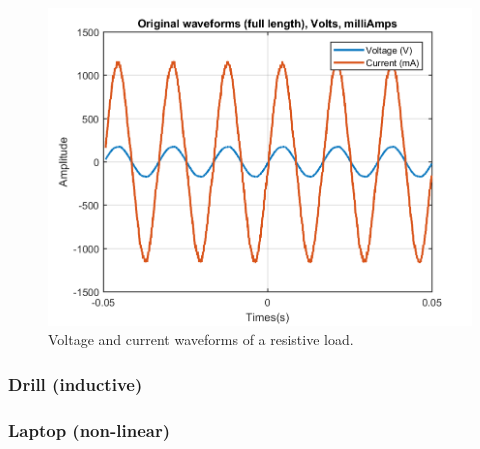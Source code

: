 \documentclass[journal]{IEEEtran}
\begin{document}
\begin{figure}[h]
\centering
\includegraphics[clip,width=\columnwidth]{original_waveform_cautin.png}
\caption{Voltage and current waveforms of a resistive load.}
\label{circuit_box}
\end{figure}


\subsubsection{Drill (inductive)}


\subsubsection{Laptop (non-linear)}
\end{document}
